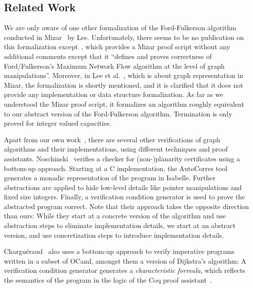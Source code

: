 \documentclass[smallcondensed]{svjour3}     %
\begin{document}
  
  \subsection{Related Work}\label{sec:related_work}
  We are only aware of one other formalization of the Ford-Fulkerson algorithm conducted in Mizar~\cite{MaRu05} by Lee. Unfortunately, there seems to be no publication
  on this formalization except~\cite{Lee05}, which provides a Mizar proof script without any additional comments except that it ``defines and proves correctness of Ford/Fulkerson's Maximum Network Flow algorithm at the level of graph manipulations''. Moreover, in Lee et al.~\cite{LeRu07}, which is about graph representation in Mizar, the formalization is shortly mentioned, and it is clarified that it does not provide any implementation or data structure formalization.
  As far as we understood the Mizar proof script, it formalizes an algorithm roughly equivalent to our abstract version of the Ford-Fulkerson algorithm.
  Termination is only proved for integer valued capacities.
  
  Apart from our own work~\cite{La14,NoLa12}, there are several other verifications of graph algorithms and their implementations, using different techniques and proof assistants. Noschinski~\cite{Nosch15} verifies a checker for (non-)planarity certificates using a bottom-up approach. Starting at a C implementation,
  the AutoCorres tool~\cite{Greenaway15,GAK12} generates a monadic representation of the program in Isabelle. Further abstractions are applied
  to hide low-level details like pointer manipulations and fixed size integers. Finally, a verification condition
  generator is used to prove the abstracted program correct. Note that their approach takes the opposite direction than ours: While they start at a concrete version of the algorithm and use abstraction steps to eliminate implementation details, we start at an abstract version, and use concretization steps to introduce implementation details.

  Chargu\'eraud~\cite{char11} also uses a bottom-up approach to verify imperative programs written in a subset of OCaml, amongst them a version of Dijkstra's algorithm:
  A verification condition generator generates a \emph{characteristic formula}, which reflects the semantics of the program in the logic of the Coq proof assistant~\cite{BeCa10}.
  
\end{document}
